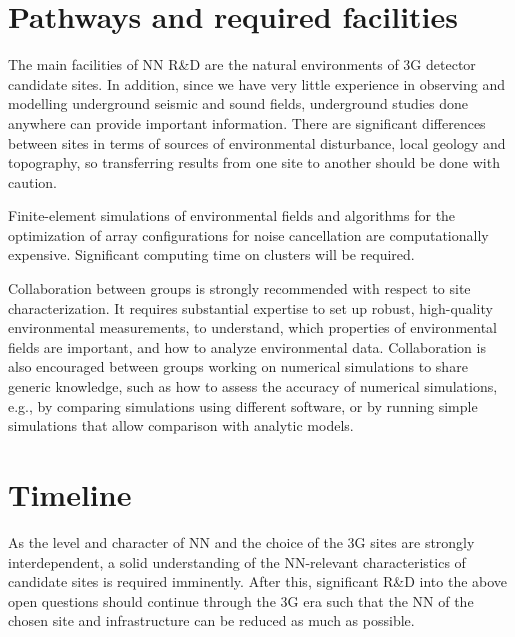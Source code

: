 \section{Pathways and required facilities}
The main facilities of NN R\&D are the natural environments of 3G detector candidate sites. In addition, since we have very little experience in observing and modelling underground seismic and sound fields, underground studies done anywhere can provide important information. There are significant differences between sites in terms of sources of environmental disturbance, local geology and topography, so transferring results from one site to another should be done with caution.

Finite-element simulations of environmental fields and algorithms for the optimization of array configurations for noise cancellation are computationally expensive. Significant computing time on clusters will be required. 

Collaboration between groups is strongly recommended with respect to site characterization. It requires substantial expertise to set up robust, high-quality environmental measurements, to understand, which properties of environmental fields are important, and how to analyze environmental data. Collaboration is also encouraged between groups working on numerical simulations to share generic knowledge, such as how to assess the accuracy of numerical simulations, e.g., by comparing simulations using different software, or by running simple simulations that allow comparison with analytic models.

\section{Timeline}

As the level and character of NN and the choice of the 3G sites are strongly interdependent, a solid understanding of the NN-relevant characteristics of candidate sites is required imminently. After this, significant R\&D into the above open questions should continue through the 3G era such that the NN of the chosen site and infrastructure can be reduced as much as possible.  

